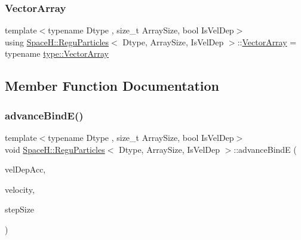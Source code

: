 \mbox{\label{class_space_h_1_1_regu_particles_aef5ee8d2bab734a42f9b79f96ebf05ca}} 
\subsubsection{\texorpdfstring{Vector\+Array}{VectorArray}}
{\footnotesize\ttfamily template$<$typename Dtype , size\+\_\+t Array\+Size, bool Is\+Vel\+Dep$>$ \\
using \mbox{\hyperlink{class_space_h_1_1_regu_particles}{Space\+H\+::\+Regu\+Particles}}$<$ Dtype, Array\+Size, Is\+Vel\+Dep $>$\+::\mbox{\hyperlink{class_space_h_1_1_vel_indep_particles_aa9983058940249df8b00fa800e8cbad2}{Vector\+Array}} =  typename \mbox{\hyperlink{struct_space_h_1_1_proto_type_a622b8e122b33bb4966a02299fb7b82d6}{type\+::\+Vector\+Array}}}



\subsection{Member Function Documentation}
\mbox{\label{class_space_h_1_1_regu_particles_af84c5b59251cc1c412124a6127aa5a98}} 
\subsubsection{\texorpdfstring{advance\+Bind\+E()}{advanceBindE()}}
{\footnotesize\ttfamily template$<$typename Dtype , size\+\_\+t Array\+Size, bool Is\+Vel\+Dep$>$ \\
void \mbox{\hyperlink{class_space_h_1_1_regu_particles}{Space\+H\+::\+Regu\+Particles}}$<$ Dtype, Array\+Size, Is\+Vel\+Dep $>$\+::advance\+BindE (\begin{DoxyParamCaption}\item[{const \mbox{\hyperlink{class_space_h_1_1_vel_indep_particles_aa9983058940249df8b00fa800e8cbad2}{Vector\+Array}} \&}]{vel\+Dep\+Acc,  }\item[{const \mbox{\hyperlink{class_space_h_1_1_vel_indep_particles_aa9983058940249df8b00fa800e8cbad2}{Vector\+Array}} \&}]{velocity,  }\item[{\mbox{\hyperlink{class_space_h_1_1_vel_indep_particles_aeb47d8131b30ed790320ff634f0d6af1}{Scalar}}}]{step\+Size }\end{DoxyParamCaption})\hspace{0.3cm}{\ttfamily [inline]}}



